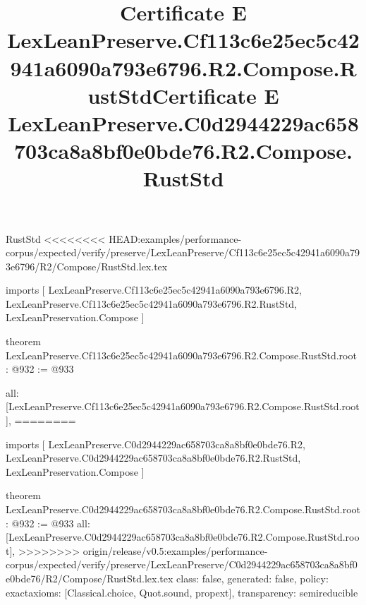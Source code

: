 \begin{lexlean}{RustStd}
<<<<<<<< HEAD:examples/performance-corpus/expected/verify/preserve/LexLeanPreserve/Cf113c6e25ec5c42941a6090a793e6796/R2/Compose/RustStd.lex.tex
\title{Certificate E LexLeanPreserve.Cf113c6e25ec5c42941a6090a793e6796.R2.Compose.RustStd}
\begin{coremodule}
imports [
  LexLeanPreserve.Cf113c6e25ec5c42941a6090a793e6796.R2,
  LexLeanPreserve.Cf113c6e25ec5c42941a6090a793e6796.R2.RustStd,
  LexLeanPreservation.Compose
]

theorem LexLeanPreserve.Cf113c6e25ec5c42941a6090a793e6796.R2.Compose.RustStd.root : @932 := @933 {
  all: [LexLeanPreserve.Cf113c6e25ec5c42941a6090a793e6796.R2.Compose.RustStd.root],
========
\title{Certificate E LexLeanPreserve.C0d2944229ac658703ca8a8bf0e0bde76.R2.Compose.RustStd}
\begin{coremodule}
imports [
  LexLeanPreserve.C0d2944229ac658703ca8a8bf0e0bde76.R2,
  LexLeanPreserve.C0d2944229ac658703ca8a8bf0e0bde76.R2.RustStd,
  LexLeanPreservation.Compose
]

theorem LexLeanPreserve.C0d2944229ac658703ca8a8bf0e0bde76.R2.Compose.RustStd.root : @932 := @933 {
  all: [LexLeanPreserve.C0d2944229ac658703ca8a8bf0e0bde76.R2.Compose.RustStd.root],
>>>>>>>> origin/release/v0.5:examples/performance-corpus/expected/verify/preserve/LexLeanPreserve/C0d2944229ac658703ca8a8bf0e0bde76/R2/Compose/RustStd.lex.tex
  class: false,
  generated: false,
  policy: exact{axioms: [Classical.choice, Quot.sound, propext]},
  transparency: semireducible
}


\end{coremodule}}
\end{coremodule}
\end{lexlean}

